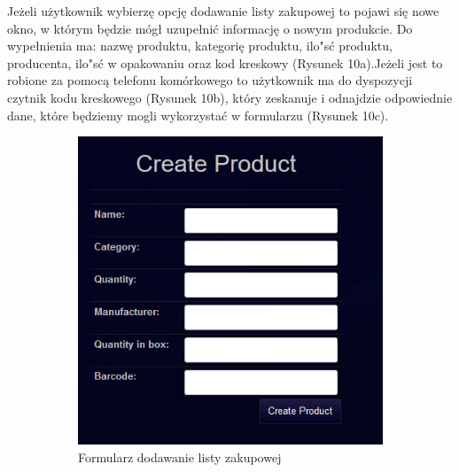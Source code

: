 \documentclass{article}
\begin{document}
Jeżeli użytkownik wybierzę opcję dodawanie listy zakupowej to pojawi się nowe okno, w którym będzie mógł uzupełnić informację o nowym produkcie. Do wypełnienia ma: nazwę produktu, kategorię produktu, ilo"sć produktu, producenta, ilo"sć w opakowaniu oraz kod kreskowy (Rysunek 10a).Jeżeli jest to robione za pomocą telefonu komórkowego to użytkownik ma do dyspozycji czytnik kodu kreskowego (Rysunek 10b), który zeskanuje i odnajdzie odpowiednie dane, które będziemy mogli wykorzystać w formularzu (Rysunek 10c).
\begin{figure}[!ht]
  \centering
\begin{subfigure}{.3\textwidth}
  \centering
   \includegraphics[width=1\textwidth]{reshp9}\par\vspace{1cm}
  \caption{Formularz dodawanie listy zakupowej}
  \label{fig:sub1}
\end{subfigure}%
\begin{subfigure}{.3\textwidth}
  \centering

\end{subfigure}
\end{figure}
\end{document}
